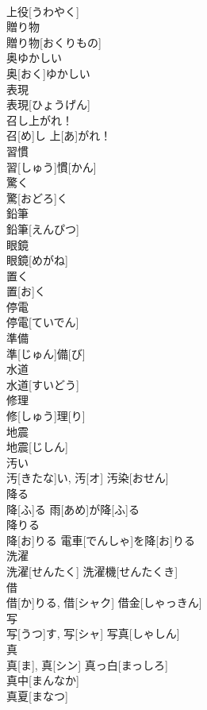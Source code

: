 \documentclass[8pt]{extreport}
\begin{document}
\begin{CJK}{UTF8}{min}
\\	上役[うわやく]	
\\	贈り物	
\\	贈り物[おくりもの]	
\\	奥ゆかしい	
\\	奥[おく]ゆかしい	
\\	表現	
\\	表現[ひょうげん]	
\\	召し上がれ！	
\\	召[め]し 上[あ]がれ！	
\\	習慣	
\\	習[しゅう]慣[かん]	
\\	驚く	
\\	驚[おどろ]く	
\\	鉛筆	
\\	鉛筆[えんぴつ]	
\\	眼鏡	
\\	眼鏡[めがね]	
\\	置く	
\\	置[お]く	
\\	停電	
\\	停電[ていでん]	
\\	準備	
\\	準[じゅん]備[び]	
\\	水道	
\\	水道[すいどう]	
\\	修理	
\\	修[しゅう]理[り]	
\\	地震	
\\	地震[じしん]	
\\	汚い	
\\	汚[きたな]い, 汚[オ]	汚染[おせん] 
\\	降る	
\\	降[ふ]る	雨[あめ]が降[ふ]る 
\\	降りる	
\\	降[お]りる	電車[でんしゃ]を降[お]りる 
\\	洗濯	
\\	洗濯[せんたく]	洗濯機[せんたくき] 
\\	借	
\\	借[か]りる, 借[シャク]	借金[しゃっきん] 
\\	写	
\\	写[うつ]す, 写[シャ]	写真[しゃしん] 
\\	真	
\\	真[ま], 真[シン]	真っ白[まっしろ] 
\\	真中[まんなか] 
\\	真夏[まなつ] 

\end{CJK}
\end{document}
